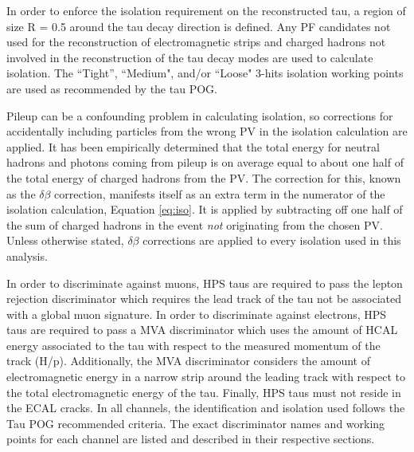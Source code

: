 In order to enforce the isolation requirement on the reconstructed tau, a region of size R = 0.5 around the tau decay  direction is defined. Any PF candidates not used for the reconstruction of electromagnetic strips and charged 
hadrons not involved in the reconstruction of the tau decay modes are used to calculate isolation. The ``Tight'', ``Medium", and/or ``Loose" 3-hits isolation working points are used as recommended by the tau POG. 

Pileup can be a confounding problem in calculating isolation, so corrections for accidentally including particles from the wrong PV in the isolation calculation are applied. It has been empirically determined that the total energy for neutral hadrons and photons coming from pileup is on average equal to about one half of the total energy of charged hadrons from the PV. The correction for this, known as the $\delta\beta$ correction, manifests itself as an extra term in the numerator of the isolation calculation, Equation \ref{eq:iso}. It is applied by subtracting off one half of the \pt sum of charged hadrons in the event \textit{not} originating from the chosen PV. Unless otherwise stated, $\delta\beta$ corrections are applied to every isolation used in this analysis.

In order to discriminate against muons, HPS taus are required to pass the lepton rejection 
discriminator which requires the lead track of the tau not be associated with a global muon signature. In order to 
discriminate against electrons, HPS taus are required to pass a MVA discriminator which uses the amount of HCAL energy 
associated to the tau with respect to the measured momentum of the track (H/p). Additionally, the MVA discriminator 
considers the amount of electromagnetic energy in a narrow strip around the leading track with respect to the total 
electromagnetic energy of the tau. Finally, HPS taus must not reside in the ECAL cracks. 
In all channels, the identification and isolation used follows the Tau POG recommended criteria.
The exact discriminator names and working points for each channel are listed and described in their respective sections.




